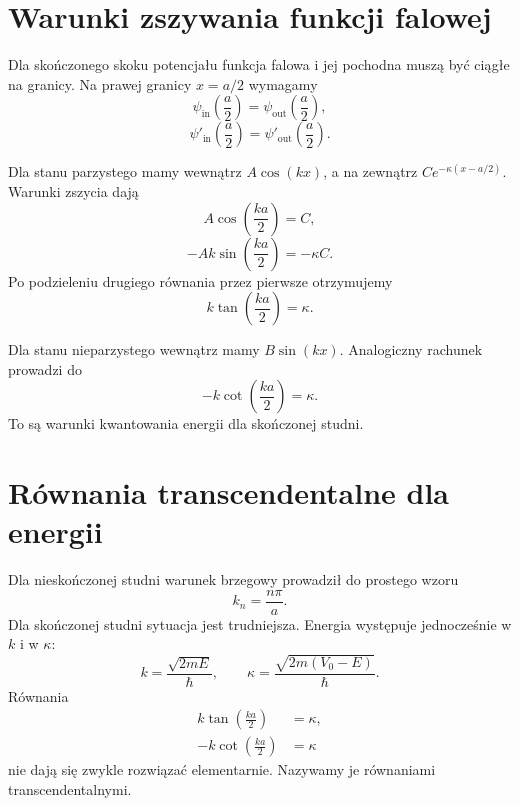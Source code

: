 \section{Warunki zszywania funkcji falowej}

Dla skończonego skoku potencjału funkcja falowa i jej pochodna muszą być ciągłe na granicy. Na prawej granicy \(x=a/2\) wymagamy
\begin{equation}
    \psi_{\mathrm{in}}\left(\frac{a}{2}\right)=
    \psi_{\mathrm{out}}\left(\frac{a}{2}\right),
\end{equation}
\begin{equation}
    \psi'_{\mathrm{in}}\left(\frac{a}{2}\right)=
    \psi'_{\mathrm{out}}\left(\frac{a}{2}\right).
\end{equation}

Dla stanu parzystego mamy wewnątrz \(A\cos(kx)\), a na zewnątrz \(C e^{-\kappa(x-a/2)}\). Warunki zszycia dają
\[
    A\cos\left(\frac{ka}{2}\right)=C,
\]
\[
    -Ak\sin\left(\frac{ka}{2}\right)=-\kappa C.
\]
Po podzieleniu drugiego równania przez pierwsze otrzymujemy
\begin{equation}
    k\tan\left(\frac{ka}{2}\right)=\kappa.
\end{equation}

Dla stanu nieparzystego wewnątrz mamy \(B\sin(kx)\). Analogiczny rachunek prowadzi do
\begin{equation}
    -k\cot\left(\frac{ka}{2}\right)=\kappa.
\end{equation}
To są warunki kwantowania energii dla skończonej studni.

\section{Równania transcendentalne dla energii}

Dla nieskończonej studni warunek brzegowy prowadził do prostego wzoru
\[
    k_n=\frac{n\pi}{a}.
\]
Dla skończonej studni sytuacja jest trudniejsza. Energia występuje jednocześnie w \(k\) i w \(\kappa\):
\[
    k=\frac{\sqrt{2mE}}{\hbar},
    \qquad
    \kappa=\frac{\sqrt{2m(V_0-E)}}{\hbar}.
\]
Równania
\begin{align}
    k\tan\left(\frac{ka}{2}\right)&=\kappa, \\
    -k\cot\left(\frac{ka}{2}\right)&=\kappa
\end{align}
nie dają się zwykle rozwiązać elementarnie. Nazywamy je równaniami transcendentalnymi.


